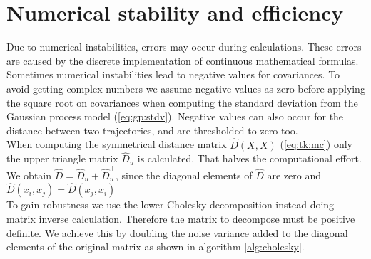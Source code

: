 %

\section{Numerical stability and efficiency}
Due to numerical instabilities, errors may occur during calculations. These errors are caused by the discrete implementation of continuous mathematical formulas. Sometimes numerical instabilities lead to negative values for covariances. To avoid getting complex numbers we assume negative values as zero before applying the square root on covariances when computing the standard deviation from the Gaussian process model (\ref{eq:gp:stdv}). Negative values can also occur for the distance between two trajectories, and are thresholded to zero too.\\

When computing the symmetrical distance matrix $\hat{D}(X,X)$ (\ref{eq:tk:mc}) only the upper triangle matrix $\hat{D}_{u}$ is calculated. That halves the computational effort. We obtain $\hat{D} = \hat{D}_{u}+\hat{D}_{u}^\top$, since the diagonal elements of $\hat{D}$ are zero and $\hat{D}(x_i,x_j) = \hat{D}(x_j,x_i)$ \\

To gain robustness we use the lower Cholesky decomposition instead doing matrix inverse calculation. Therefore the matrix to decompose must be positive definite. We achieve this by doubling the noise variance added to the diagonal elements of the original matrix as shown in algorithm \ref{alg:cholesky}.

